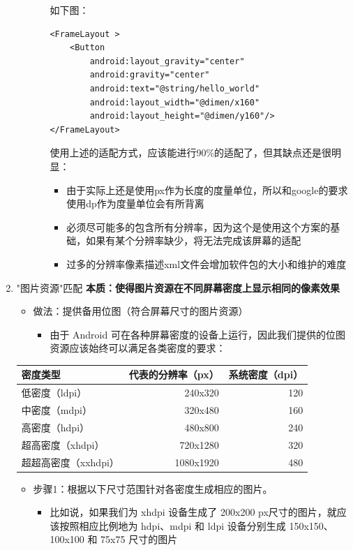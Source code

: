 \documentclass[9pt, b5paper]{article}
\begin{document}
\begin{enumerate}
\begin{enumerate}
\begin{enumerate}
如下图：
\begin{verbatim}
<FrameLayout >
    <Button
        android:layout_gravity="center"
        android:gravity="center"
        android:text="@string/hello_world"
        android:layout_width="@dimen/x160"
        android:layout_height="@dimen/y160"/>
</FrameLayout>
\end{verbatim}

使用上述的适配方式，应该能进行90\%的适配了，但其缺点还是很明显：
\begin{itemize}
\item 由于实际上还是使用px作为长度的度量单位，所以和google的要求使用dp作为度量单位会有所背离
\item 必须尽可能多的包含所有分辨率，因为这个是使用这个方案的基础，如果有某个分辨率缺少，将无法完成该屏幕的适配
\item 过多的分辨率像素描述xml文件会增加软件包的大小和维护的难度
\end{itemize}
\end{enumerate}
\end{enumerate}

\item "图片资源"匹配
\label{sec-6-6-2-2}
\textbf{本质：使得图片资源在不同屏幕密度上显示相同的像素效果}

\begin{itemize}
\item 做法：提供备用位图（符合屏幕尺寸的图片资源）
\begin{itemize}
\item 由于 Android 可在各种屏幕密度的设备上运行，因此我们提供的位图资源应该始终可以满足各类密度的要求：
\end{itemize}
\end{itemize}
\begin{center}
\begin{tabular}{lrr}
\hline
密度类型 & 代表的分辨率（px） & 系统密度（dpi）\\
\hline
低密度（ldpi） & 240x320 & 120\\
中密度（mdpi） & 320x480 & 160\\
高密度（hdpi） & 480x800 & 240\\
超高密度（xhdpi） & 720x1280 & 320\\
超超高密度（xxhdpi） & 1080x1920 & 480\\
\hline
\end{tabular}
\end{center}
\begin{itemize}
\item 步骤1：根据以下尺寸范围针对各密度生成相应的图片。
\begin{itemize}
\item 比如说，如果我们为 xhdpi 设备生成了 200x200 px尺寸的图片，就应该按照相应比例地为 hdpi、mdpi 和 ldpi 设备分别生成 150x150、100x100 和 75x75 尺寸的图片
\end{itemize}
\end{itemize}


\end{enumerate}
\end{document}
